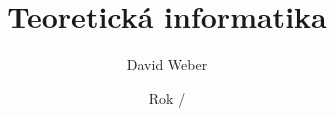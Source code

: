 %
%

\makeatletter
{}
\makeatother

\providecommand{\subjectname}{Teoretická informatika}
\providecommand{\schoollogo}{../images/SPSE-Jecna_Logo.pdf}

\title[\presentationtitlefooter]{\subjectname}
\subtitle{\presentationtitle}
\author{David Weber}
\def\email{weber3@spsejecna.cz}
\date{%
    Rok
    \pgfmathprintnumber[fixed,precision=0,zerofill,1000 sep={}]{\firstyear}/%
    \pgfmathprintnumber[fixed,precision=0,zerofill,1000 sep={}]{\secondyearlasttwo}%
}


\newcommand{\tpnohyphen}{%
    \hyphenpenalty=10000\exhyphenpenalty=10000%
    \tolerance=9999\emergencystretch=3em\relax
}

\newcommand{\tptopic}[1]{%
    \tpnohyphen
    {\usebeamerfont{title}\Large
     \hyphenchar\font=-1\relax
     #1\par
     \hyphenchar\font=`\-\relax}%
}

\makeatletter
\newcommand{\tpinverse}{%
    \tpnohyphen
    \setbeamercolor{math text}{fg=white}%
    \colorlet{problemfg}{white}%
    \@ifundefined{Astar}{}{\renewcommand{\Astar}{\textup{A}\textsuperscript{*}}}%
}
\makeatother

